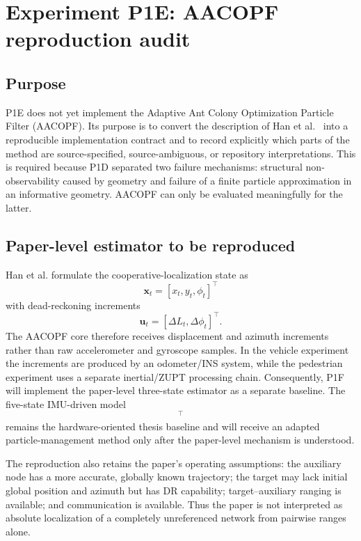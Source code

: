 \section{Experiment P1E: AACOPF reproduction audit}
\subsection{Purpose}
P1E does not yet implement the Adaptive Ant Colony Optimization Particle Filter (AACOPF). Its purpose is to convert the description of Han et al.~\cite{han2020cooperative} into a reproducible implementation contract and to record explicitly which parts of the method are source-specified, source-ambiguous, or repository interpretations. This is required because P1D separated two failure mechanisms: structural non-observability caused by geometry and failure of a finite particle approximation in an informative geometry. AACOPF can only be evaluated meaningfully for the latter.

\subsection{Paper-level estimator to be reproduced}
Han et al. formulate the cooperative-localization state as
\begin{equation}
    \bm x_t=[x_t,y_t,\phi_t]^\top
\end{equation}
with dead-reckoning increments
\begin{equation}
    \bm u_t=[\Delta L_t,\Delta\phi_t]^\top.
\end{equation}
The AACOPF core therefore receives displacement and azimuth increments rather than raw accelerometer and gyroscope samples. In the vehicle experiment the increments are produced by an odometer/INS system, while the pedestrian experiment uses a separate inertial/ZUPT processing chain. Consequently, P1F will implement the paper-level three-state estimator as a separate baseline. The five-state IMU-driven model
\begin{equation}
    [p_x,p_y,v_x,v_y,\psi]^\top
\end{equation}
remains the hardware-oriented thesis baseline and will receive an adapted particle-management method only after the paper-level mechanism is understood.

The reproduction also retains the paper's operating assumptions: the auxiliary node has a more accurate, globally known trajectory; the target may lack initial global position and azimuth but has DR capability; target--auxiliary ranging is available; and communication is available. Thus the paper is not interpreted as absolute localization of a completely unreferenced network from pairwise ranges alone.

